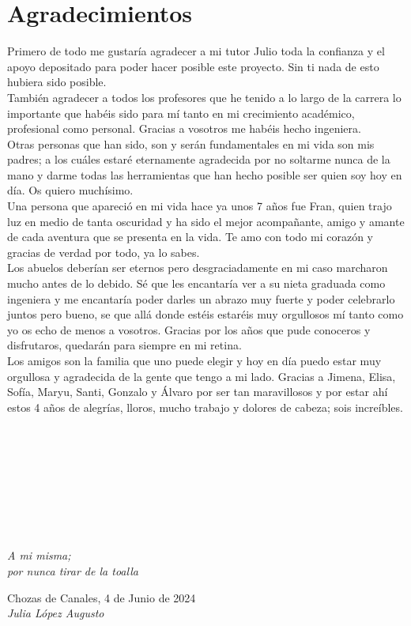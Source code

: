 \cleardoublepage

\chapter*{Agradecimientos}

Primero de todo me gustaría agradecer a mi tutor Julio toda la confianza y el apoyo depositado para poder hacer posible este proyecto. Sin ti nada de esto hubiera sido posible.\\

También agradecer a todos los profesores que he tenido a lo largo de la carrera lo importante que habéis sido para mí tanto en mi crecimiento académico, profesional como personal. Gracias a vosotros me habéis hecho ingeniera. \\

Otras personas que han sido, son y serán fundamentales en mi vida son mis padres; a los cuáles estaré eternamente agradecida por no soltarme nunca de la mano y darme todas las herramientas que han hecho posible ser quien soy hoy en día. Os quiero muchísimo.\\

Una persona que apareció en mi vida hace ya unos 7 años fue Fran, quien trajo luz en medio de tanta oscuridad y ha sido el mejor acompañante, amigo y amante de cada aventura que se presenta en la vida. Te amo con todo mi corazón y gracias de verdad por todo, ya lo sabes.\\

Los abuelos deberían ser eternos pero desgraciadamente en mi caso marcharon mucho antes de lo debido. Sé que les encantaría ver a su nieta graduada como ingeniera y me encantaría poder darles un abrazo muy fuerte y poder celebrarlo juntos pero bueno, se que allá donde estéis estaréis muy orgullosos mí tanto como yo os echo de menos a vosotros. Gracias por los años que pude conoceros y disfrutaros, quedarán para siempre en mi retina. \\

Los amigos son la familia que uno puede elegir y hoy en día puedo estar muy orgullosa y agradecida de la gente que tengo a mi lado. Gracias a Jimena, Elisa, Sofía, Maryu, Santi, Gonzalo y Álvaro por ser tan maravillosos y por estar ahí estos 4 años de alegrías, lloros, mucho trabajo y dolores de cabeza; sois increíbles.
\\
\ %

\

\

\

\

\begin{flushright}
		\vspace{4.0 cm}
		\emph{A mi misma;\\
      por nunca tirar de la toalla}\\
		\par
		\vspace{1.0 cm}
		Chozas de Canales, 4 de Junio de 2024\\ %
		\emph{Julia López Augusto}
\end{flushright}

\thispagestyle{empty}

